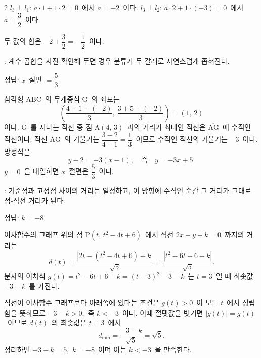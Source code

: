 \documentclass[10pt,fleqn]{article}
\begin{document}
\begin{multicols*}{2}
$l_3 \perp l_1$: $a \cdot 1 + 1 \cdot 2 = 0$\ 에서 $a = -2$\ 이다.
$l_3 \perp l_2$: $a \cdot 2 + 1 \cdot (-3) = 0$\ 에서 $a = \dfrac{3}{2}$\ 이다.

두 값의 합은 $-2 + \dfrac{3}{2} = -\dfrac{1}{2}$\ 이다.

\begin{dmcriticalpoint}
: 계수 곱합을 사전 확인해 두면 경우 분류가 두 갈래로 자연스럽게 좁혀진다.
\end{dmcriticalpoint}

\begin{dmanswerbox}
정답: $x$\ 절편 $= \dfrac{5}{3}$
\end{dmanswerbox}

삼각형 $\mathrm{ABC}$\ 의 무게중심 $\mathrm{G}$\ 의 좌표는
\[ \left( \dfrac{4+1+(-2)}{3},\ \dfrac{3+5+(-2)}{3} \right) = (1,\, 2) \]
이다. $\mathrm{G}$\ 를 지나는 직선 중 점 $\mathrm{A}(4,\, 3)$\ 과의 거리가 최대인 직선은 $\overline{\mathrm{AG}}$\ 에 수직인 직선이다. 직선 $\mathrm{AG}$\ 의 기울기는 $\dfrac{3-2}{4-1} = \dfrac{1}{3}$\ 이므로 수직인 직선의 기울기는 $-3$\ 이다. 방정식은
\[ y - 2 = -3(x - 1),\quad \text{즉}\quad y = -3x + 5. \]
$y = 0$\ 을 대입하면 $x$\ 절편은 $\dfrac{5}{3}$\ 이다.

\begin{dmcriticalpoint}
: 기준점과 고정점 사이의 거리는 일정하고, 이 방향에 수직인 순간 그 거리가 그대로 점-직선 거리가 된다.
\end{dmcriticalpoint}

\begin{dmanswerbox}
정답: $k=-8$
\end{dmanswerbox}

이차함수의 그래프 위의 점 $\mathrm{P}(t,\, t^2 - 4t + 6)$\ 에서 직선 $2x - y + k = 0$\ 까지의 거리는
\[ d(t) = \dfrac{|2t - (t^2 - 4t + 6) + k|}{\sqrt{5}} = \dfrac{|t^2 - 6t + 6 - k|}{\sqrt{5}}. \]
분자의 이차식 $g(t) = t^2 - 6t + 6 - k = (t - 3)^2 - 3 - k$\ 는 $t = 3$\ 일 때 최솟값 $-3 - k$\ 를 가진다.

직선이 이차함수 그래프보다 아래쪽에 있다는 조건은 $g(t) > 0$\ 이 모든 $t$\ 에서 성립함을 뜻하므로 $-3 - k > 0$,\ 즉 $k < -3$\ 이다. 이때 절댓값을 벗기면 $|g(t)| = g(t)$\ 이므로 $d(t)$\ 의 최솟값은 $t = 3$\ 에서
\[ d_{\min} = \dfrac{-3 - k}{\sqrt{5}} = \sqrt{5}. \]
정리하면 $-3 - k = 5$,\ $k = -8$\ 이며 이는 $k < -3$\ 을 만족한다.


\end{multicols*}
\end{document}
